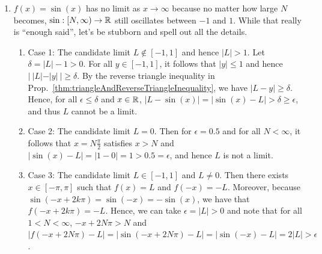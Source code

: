 \begin{enumerate}
    \item $f(x) = \sin(x)$ has no limit as $x \to \infty$ because no matter how large $N$ becomes,  $\sin:[N, \infty) \to \mathbb R$ still oscillates between $-1$ and $1$. While that really is ``enough said'', let's be stubborn and spell out all the details. 
    \begin{enumerate}
        \item Case 1: The candidate limit $L \notin [-1, 1]$ and hence $|L| > 1$. Let $\delta =|L|-1>0$. For all $y\in [-1, 1]$, it follows that $|y|\le1$ and hence $|~|L|-|y|~| \ge \delta$. By the reverse triangle inequality in Prop.~\ref{thm:triangleAndReverseTriangleInequality}, we have $|L-y| \ge \delta$. Hence, for all $\epsilon \le \delta$ and $x \in \mathbb R$, $|L - \sin(x)|=|\sin(x)-L| > \delta \ge \epsilon$, and thus $L$ cannot be a limit.

        \item Case 2: The candidate limit $L=0$. Then for $\epsilon = 0.5$ and for all $N< \infty$,  it follows that $x = N \frac{\pi}{2}$ satisfies $x > N$ and $|\sin(x)-L|=|1 - 0| = 1 > 0.5 = \epsilon$, and hence $L$ is not a limit. 
        
        \item Case 3: The candidate limit $L\in [-1, 1]$ and $L \neq 0$. Then there exists $x\in[-\pi, \pi]$ such that $f(x)=L$ and $f(-x)=-L$. Moreover, because $\sin(-x + 2 k \pi) = \sin(-x) = -\sin(x)$, we have that $f(-x + 2 k \pi)=-L$. Hence, we can take $\epsilon = |L|>0$ and note that for all $1<N < \infty$, $-x + 2N \pi > N$ and $|f(-x + 2N \pi) - L| = |\sin(-x + 2N \pi)-L| =  |\sin(-x)-L| = 2|L|>\epsilon$.
    \end{enumerate}

\end{enumerate}

\Qed

\bigskip



